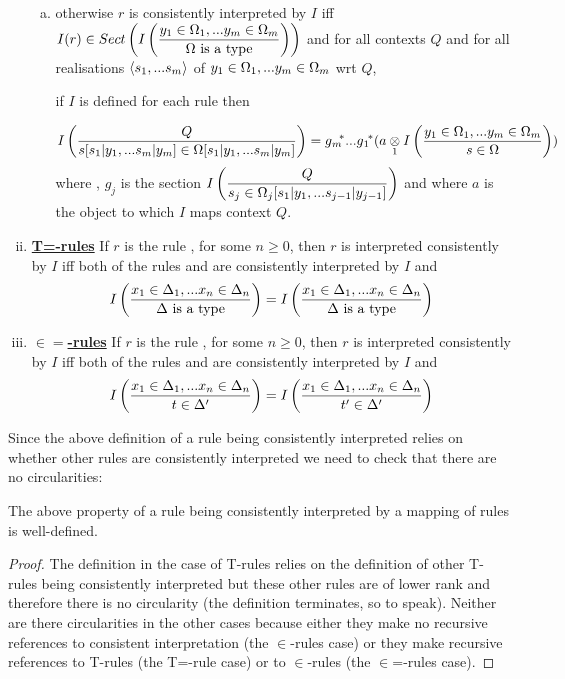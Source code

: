 \begin{definition}
\begin{enumerate}[(i)]
\begin{enumerate}[(a)]
\item otherwise $r$ is consistently interpreted by $I$ iff $\displaystyle I(r) \in \sectionsofImappedrule{\yOmega{m}}{\isT{\Omega}}$ and
for all contexts $Q$ and for all realisations $\tuple{\sm}$ of $\yOmega{m}$ wrt $Q$, 
\begin{newtt}
if $I$ is defined for each rule  then
\end{newtt}
$$ \Imappedrule{Q}{\ofT{s[\SUBsFORy{m}]}{\Omega[\SUBsFORy{m}]}} = \gmstar...\gonestar(\crossx{a}{\Imappedrule{\yOmega{m}}{\ofT{s}{\Omega}}}{1})$$
where \foreachj, $g_j$ is the section
$\displaystyle\Imappedrule{Q}{ \ofT{s_j}{\Omega_j[\SUBsFORy{j-1}]}}$
and where $a$ is the object to which $I$ maps context $Q$.
\end{enumerate}

\item \underline{\textbf{T=-rules}} 
If $r$ is the rule  , for some $n \geq 0$, 
then $r$ is interpreted consistently by $I$ iff
both of the rules \ZDelta and \ZDeltap
are consistently interpreted by $I$ and
$$
\Imappedrule{\xDelta{n}}{\isT{\Delta}} = \Imappedrule{\xDelta{n}}{\isT{\Delta}}
$$
 
\item \underline{\textbf{$\boldsymbol{\in=}$-rules}} 
If $r$ is the rule  , for some $n \geq 0$, 
then $r$ is interpreted consistently by $I$ iff
both of the rules \ZtDelta and 
are consistently interpreted by $I$ and
$$
\Imappedrule{\xDelta{n}}{\ofT{t}{\Delta'}} = \Imappedrule{\xDelta{n}}{\ofT{t'}{\Delta'}}
$$
\end{enumerate}
\end{definition}

Since the above definition of a rule being consistently interpreted relies on whether other rules are consistently interpreted we need to check that there are no circularities:
\begin{lemma}
The above property of a rule being consistently interpreted by a mapping of rules is well-defined. 
\end{lemma}
\begin{proof}
The definition in the case of T-rules relies on the definition of other T-rules being consistently interpreted but these other rules are of lower rank and therefore there is no circularity 
(the definition terminates, so to speak).
Neither are there circularities in the other cases because either they make no recursive references to consistent interpretation (the $\in$-rules case)
or they make recursive references to T-rules (the T=-rule case) or to $\in$-rules (the $\in$=-rules case).
\end{proof}

